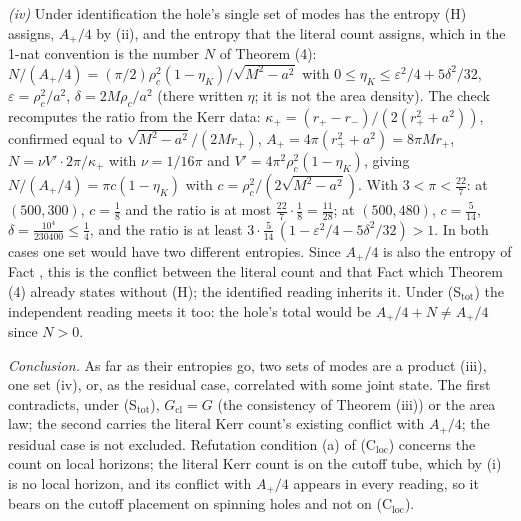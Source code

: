 \emph{(iv)} Under identification the hole's single set of modes has the entropy (H) assigns, $A_{+}/4$ by (ii), and the entropy that the literal count assigns, which in the 1-nat convention is the number $N$ of Theorem (4): $N/(A_{+}/4) = (\pi/2)\rho_{c}^{2}(1 - \eta_{K})/\sqrt{M^{2} - a^{2}}$ with $0 \le \eta_{K} \le \varepsilon^{2}/4 + 5\delta^{2}/32$, $\varepsilon = \rho_{c}^{2}/a^{2}$, $\delta = 2M\rho_{c}/a^{2}$ (there written $\eta$; it is not the area density). The check recomputes the ratio from the Kerr data: $\kappa_{+} = (r_{+} - r_{-})/(2(r_{+}^{2} + a^{2}))$, confirmed equal to $\sqrt{M^{2} - a^{2}}/(2Mr_{+})$, $A_{+} = 4\pi(r_{+}^{2} + a^{2}) = 8\pi Mr_{+}$, $N = \nu V'\cdot 2\pi/\kappa_{+}$ with $\nu = 1/16\pi$ and $V' = 4\pi^{2}\rho_{c}^{2}(1 - \eta_{K})$, giving $N/(A_{+}/4) = \pi c(1 - \eta_{K})$ with $c = \rho_{c}^{2}/(2\sqrt{M^{2} - a^{2}})$. With $3 < \pi < \tfrac{22}{7}$: at $(500, 300)$, $c = \tfrac18$ and the ratio is at most $\tfrac{22}{7}\cdot\tfrac18 = \tfrac{11}{28}$; at $(500, 480)$, $c = \tfrac{5}{14}$, $\delta = \tfrac{10^{4}}{230400} \le \tfrac14$, and the ratio is at least $3\cdot\tfrac{5}{14}\,(1 - \varepsilon^{2}/4 - 5\delta^{2}/32) > 1$. In both cases one set would have two different entropies. Since $A_{+}/4$ is also the entropy of Fact , this is the conflict between the literal count and that Fact which Theorem (4) already states without (H); the identified reading inherits it. Under (S$_{\mathrm{tot}}$) the independent reading meets it too: the hole's total would be $A_{+}/4 + N \ne A_{+}/4$ since $N > 0$.

\emph{Conclusion.} As far as their entropies go, two sets of modes are a product (iii), one set (iv), or, as the residual case, correlated with some joint state. The first contradicts, under (S$_{\mathrm{tot}}$), $G_{\mathrm{cl}} = G$ (the consistency of Theorem (iii)) or the area law; the second carries the literal Kerr count's existing conflict with $A_{+}/4$; the residual case is not excluded. Refutation condition (a) of (C$_{\mathrm{loc}}$) concerns the count on local horizons; the literal Kerr count is on the cutoff tube, which by (i) is no local horizon, and its conflict with $A_{+}/4$ appears in every reading, so it bears on the cutoff placement on spinning holes and not on (C$_{\mathrm{loc}}$).
